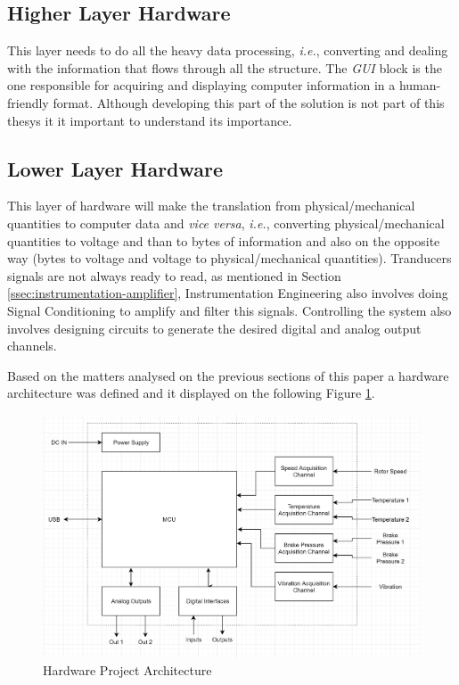 	\subsection{Higher Layer Hardware}\label{ssec:higherLayerlHardware}
	
		This layer needs to do all the heavy data processing, \textit{i.e.}, converting and dealing with the information that flows through all the structure. The \textit{GUI} block is the one responsible for acquiring and displaying computer information in a human-friendly format. Although developing this part of the solution is not part of this thesys it it important to understand its importance.

	\subsection{Lower Layer Hardware}\label{ssec:lowerLayerlHardware}

		This layer of hardware will make the translation from physical/mechanical quantities to computer data and \textit{vice versa}, \textit{i.e.}, converting physical/mechanical quantities to voltage and than to bytes of information and also on the opposite way (bytes to voltage and voltage to physical/mechanical quantities). Tranducers signals are not always ready to read, as mentioned in Section \ref{ssec:instrumentation-amplifier}, Instrumentation Engineering also involves doing Signal Conditioning to amplify and filter this signals. Controlling the system also involves designing circuits to generate the desired digital and analog output channels.
		\par
		Based on the matters analysed on the previous sections of this paper a hardware architecture was defined and it displayed on the following Figure \ref{fig:hardwareProject}.
	
		\begin{figure}[htbp]
			\centering
			\includegraphics[scale=0.8]{figuras/fig-hardwareProject}
			\caption{Hardware Project Architecture \cite{hw-proj}}
			\label{fig:hardwareProject}
		\end{figure}

